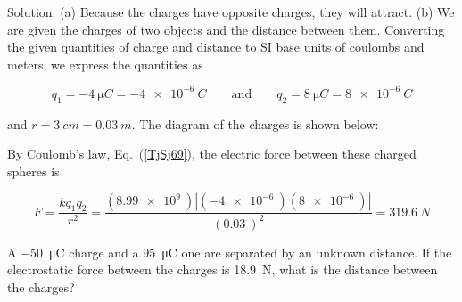 \documentclass[dvipsnames]{article}
\begin{document}
Solution: (a) Because the charges have opposite charges, they will attract. (b) We are given the charges of two objects and the distance between them. Converting the given quantities of charge and distance to SI base units of coulombs and meters, we express the quantities as

\begin{equation*}
    q_1 = \SI{-4}{\micro C} = \SI{-4e-6}{C} 
    \qquad \text{and} \qquad
    q_2 = \SI{8}{\micro C} = \SI{8e-6}{C}
\end{equation*}

and $r = \SI{3}{cm} = \SI{0.03}{m}$. The diagram of the charges is shown below:

\begin{center}
\end{center}

By Coulomb's law, Eq.~(\ref{TjSj69}), the electric force between these charged spheres is

\begin{equation*}
    F = \frac{k q_1 q_2}{r^2} = \frac{\left(\SI{8.99e9}{}\right) \left|\left(\SI{-4e-6}{}\right) \left(\SI{8e-6}{}\right)\right|}{\left(\SI{0.03}{}\right)^2} =
    \SI{319.6}{N}
\end{equation*}

\begin{example}
A \SI{-50}{\micro C} charge and a \SI{95}{\micro C} one are separated by an unknown distance. If the electrostatic force between the charges is \SI{18.9}{N}, what is the distance between the charges?
\end{example}
\end{document}
